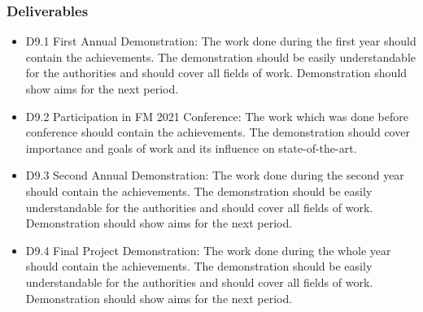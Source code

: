 \subsubsection{Deliverables}
	\begin{itemize}
		\item D9.1 First Annual Demonstration: The work done during the first year should contain the achievements. The demonstration should be easily understandable for the authorities and should cover all fields of work. Demonstration should show aims for the next period.
		\item D9.2 Participation in FM 2021 Conference: The work which was done before conference should contain the achievements. The demonstration should cover importance and goals of work and its influence on state-of-the-art.
		\item D9.3 Second Annual Demonstration: The work done during the second year should contain the achievements. The demonstration should be easily understandable for the authorities and should cover all fields of work. Demonstration should show aims for the next period.
		\item D9.4 Final Project Demonstration: The work done during the whole year should contain the achievements. The demonstration should be easily understandable for the authorities and should cover all fields of work. Demonstration should show aims for the next period.
	\end{itemize}